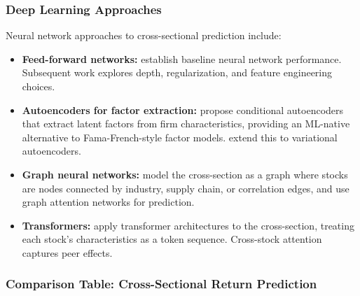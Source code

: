 \subsubsection{Deep Learning Approaches}

Neural network approaches to cross-sectional prediction include:

\begin{itemize}[leftmargin=*]
    \item \textbf{Feed-forward networks:} \citet{Gu2020} establish baseline neural network performance. Subsequent work explores depth, regularization, and feature engineering choices.

    \item \textbf{Autoencoders for factor extraction:} \citet{Gu2021} propose conditional autoencoders that extract latent factors from firm characteristics, providing an ML-native alternative to Fama-French-style factor models. \citet{Kim2021} extend this to variational autoencoders.

    \item \textbf{Graph neural networks:} \citet{Chen2022} model the cross-section as a graph where stocks are nodes connected by industry, supply chain, or correlation edges, and use graph attention networks for prediction.

    \item \textbf{Transformers:} \citet{Duan2022} apply transformer architectures to the cross-section, treating each stock's characteristics as a token sequence. Cross-stock attention captures peer effects.
\end{itemize}

\subsubsection{Comparison Table: Cross-Sectional Return Prediction}

